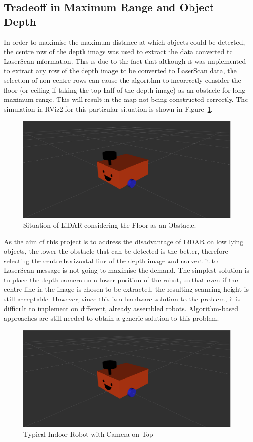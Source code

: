\subsection{Tradeoff in Maximum Range and Object Depth}
\label{subsec:tradeoff}
In order to maximise the maximum distance at which objects could be detected, 
the centre row of the depth image was used to extract the data converted to LaserScan information. 
This is due to the fact that although it was implemented to extract any row of the depth image to be converted to LaserScan data, 
the selection of non-centre rows can cause the algorithm to incorrectly consider the floor (or ceiling if taking the top half of the depth image) 
as an obstacle for long maximum range. This will result in the map not being constructed correctly. 
The simulation in RViz2 for this particular situation is shown in Figure~\ref{fig:floor_obstacle}.
\begin{figure}[H]
    \centering
    \includegraphics[width=0.8\linewidth]{figs/robot.png}
    \caption{Situation of LiDAR considering the Floor as an Obstacle.}
    \label{fig:floor_obstacle}
\end{figure}
As the aim of this project is to address the disadvantage of LiDAR on low lying objects, 
the lower the obstacle that can be detected is the better, 
therefore selecting the centre horizontal line of the depth image 
and convert it to LaserScan message is not going to maximise the demand. 
The simplest solution is to place the depth camera on a lower position of the robot, 
so that even if the centre line in the image is chosen to be extracted, 
the resulting scanning height is still acceptable. 
However, since this is a hardware solution to the problem, 
it is difficult to implement on different, already assembled robots. 
Algorithm-based approaches are still needed to obtain a generic solution to this problem. 

\begin{figure}[H]
    \centering
    \includegraphics[width=0.8\linewidth]{figs/robot.png}
    \caption{Typical Indoor Robot with Camera on Top}
\end{figure}

